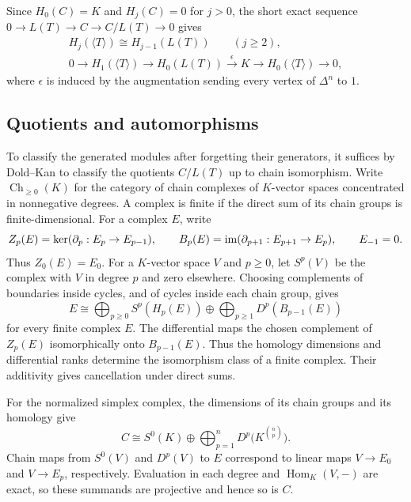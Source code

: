 Since $H_0(C)=K$ and
$H_j(C)=0$ for $j>0$, the short exact sequence
$0\to L(T)\to C\to C/L(T)\to0$ gives
\begin{equation}\label{eq:generated-homology}
 \begin{gathered}
 H_j(\langle T\rangle)\cong H_{j-1}(L(T))\qquad(j\geq2),\\
 0\longrightarrow H_1(\langle T\rangle)\longrightarrow H_0(L(T))
 \xrightarrow{\epsilon}K\longrightarrow H_0(\langle T\rangle)
 \longrightarrow0,
 \end{gathered}
\end{equation}
where $\epsilon$ is induced by the augmentation sending every vertex of
$\Delta^n$ to $1$.

\subsection{Quotients and automorphisms}

To classify the generated modules after forgetting their generators, it suffices
by Dold--Kan to classify the quotients $C/L(T)$ up to chain isomorphism.
Write $\operatorname{Ch}_{\geq0}(K)$ for the category of chain complexes of
$K$-vector spaces concentrated in nonnegative degrees. A complex is finite
if the direct sum of its chain groups is finite-dimensional. For a complex $E$,
write
\[
 Z_p(E)=\ker(\partial_p:E_p\to E_{p-1}),\qquad
 B_p(E)=\operatorname{im}(\partial_{p+1}:E_{p+1}\to E_p),
 \qquad E_{-1}=0.
\]
Thus $Z_0(E)=E_0$. For a $K$-vector space $V$ and
$p\geq0$, let $S^p(V)$ be the complex with $V$ in degree $p$ and zero elsewhere. Choosing complements of boundaries
inside cycles, and of cycles inside each chain group, gives
\begin{equation}\label{eq:finite-chain-splitting}
 E\cong\bigoplus_{p\geq0}S^p(H_p(E))
       \oplus\bigoplus_{p\geq1}D^p(B_{p-1}(E))
\end{equation}
for every finite complex $E$. The differential maps the chosen
complement of $Z_p(E)$ isomorphically onto $B_{p-1}(E)$.
Thus the homology dimensions and differential ranks determine the
isomorphism class of a finite complex. Their additivity gives cancellation
under direct sums.

For the normalized simplex complex, the dimensions of its chain groups
and its homology give
\begin{equation}\label{eq:simplex-projective}
 C\cong S^0(K)\oplus\bigoplus_{p=1}^n
                   D^p\bigl(K^{\binom np}\bigr).
\end{equation}
Chain maps from $S^0(V)$ and $D^p(V)$ to $E$ correspond to linear
maps $V\to E_0$ and $V\to E_p$, respectively. Evaluation in each
degree and $\operatorname{Hom}_K(V,-)$ are exact, so these summands
are projective and hence so is $C$.

